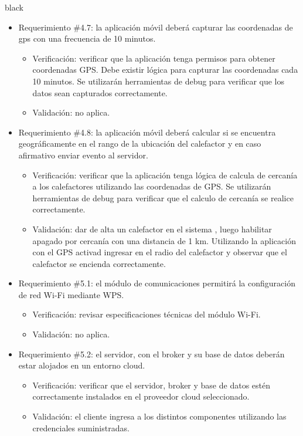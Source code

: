 \documentclass[
11pt, %
codirector, %
]{charter}
\begin{document}
\begin{consigna}{black}
\begin{itemize}
\item Requerimiento \#4.7: la aplicación móvil deberá capturar las coordenadas de gps con una frecuencia de 10 minutos.

\begin{itemize}
	\item Verificación: verificar que la aplicación tenga permisos para obtener coordenadas GPS. Debe existir lógica para capturar las coordenadas cada 10 minutos. Se utilizarán herramientas de debug para verificar que los datos sean capturados correctamente. 
	\item Validación: no aplica.
\end{itemize}

\item Requerimiento \#4.8: la aplicación móvil deberá calcular si se encuentra geográficamente en el rango de la ubicación del calefactor y en caso afirmativo enviar evento al servidor.

\begin{itemize}
	\item Verificación: verificar que la aplicación tenga lógica de calcula de cercanía a los calefactores utilizando las coordenadas de GPS.  Se utilizarán herramientas de debug para verificar que el calculo de cercanía se realice correctamente. 
	\item Validación: dar de alta un calefactor en el sistema , luego habilitar apagado por cercanía con una distancia de 1 km. Utilizando la aplicación con el GPS activad ingresar en el radio del calefactor y observar que el calefactor se encienda correctamente.
\end{itemize}

\item Requerimiento \#5.1: el módulo de comunicaciones permitirá la configuración de red Wi-Fi mediante WPS.

\begin{itemize}
	\item Verificación: revisar especificaciones técnicas del módulo Wi-Fi.
	\item Validación: no aplica.
\end{itemize}

\item Requerimiento \#5.2: el servidor, con el broker y su base de datos deberán estar alojados en un entorno cloud.

\begin{itemize}
	\item Verificación: verificar que el servidor, broker y base de datos estén correctamente instalados en el proveedor cloud seleccionado. 
	\item Validación: el cliente ingresa a los distintos componentes utilizando las credenciales suministradas.
\end{itemize}


\end{itemize}
\end{consigna}
\end{document}
